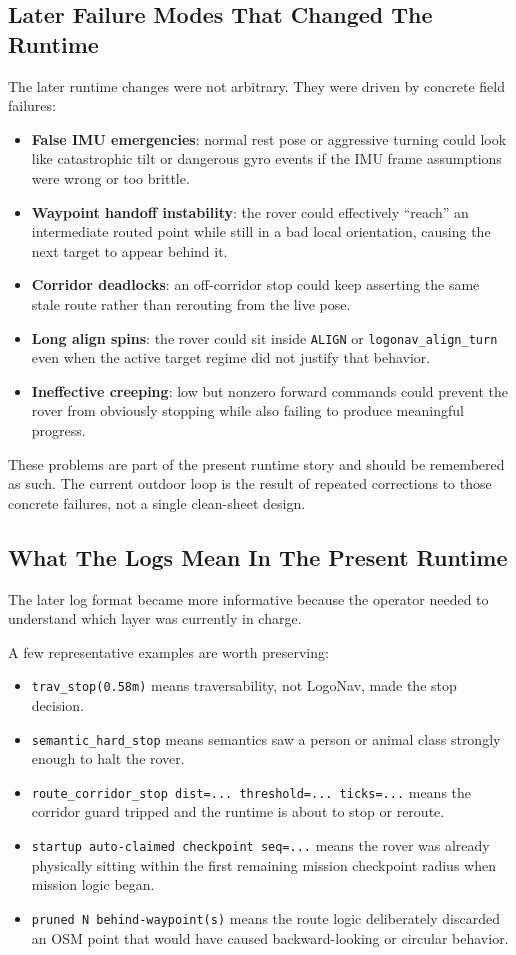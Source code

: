\documentclass[11pt]{article}
\begin{document}
\subsection*{Later Failure Modes That Changed The Runtime}
The later runtime changes were not arbitrary. They were driven by concrete field failures:
\begin{itemize}[leftmargin=*]
\item \textbf{False IMU emergencies}: normal rest pose or aggressive turning could look like catastrophic tilt or dangerous gyro events if the IMU frame assumptions were wrong or too brittle.
\item \textbf{Waypoint handoff instability}: the rover could effectively ``reach'' an intermediate routed point while still in a bad local orientation, causing the next target to appear behind it.
\item \textbf{Corridor deadlocks}: an off-corridor stop could keep asserting the same stale route rather than rerouting from the live pose.
\item \textbf{Long align spins}: the rover could sit inside \texttt{ALIGN} or \texttt{logonav\_align\_turn} even when the active target regime did not justify that behavior.
\item \textbf{Ineffective creeping}: low but nonzero forward commands could prevent the rover from obviously stopping while also failing to produce meaningful progress.
\end{itemize}

These problems are part of the present runtime story and should be remembered as such. The current outdoor loop is the result of repeated corrections to those concrete failures, not a single clean-sheet design.

\subsection*{What The Logs Mean In The Present Runtime}
The later log format became more informative because the operator needed to understand which layer was currently in charge.

A few representative examples are worth preserving:
\begin{itemize}[leftmargin=*]
\item \texttt{trav\_stop(0.58m)} means traversability, not LogoNav, made the stop decision.
\item \texttt{semantic\_hard\_stop} means semantics saw a person or animal class strongly enough to halt the rover.
\item \texttt{route\_corridor\_stop dist=... threshold=... ticks=...} means the corridor guard tripped and the runtime is about to stop or reroute.
\item \texttt{startup auto-claimed checkpoint seq=...} means the rover was already physically sitting within the first remaining mission checkpoint radius when mission logic began.
\item \texttt{pruned N behind-waypoint(s)} means the route logic deliberately discarded an OSM point that would have caused backward-looking or circular behavior.
\end{itemize}
\end{document}
